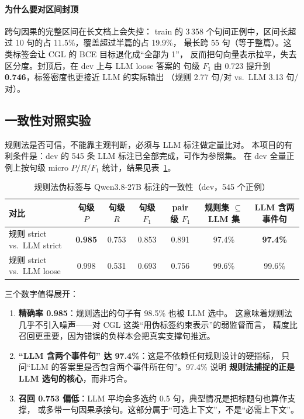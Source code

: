 \paragraph{为什么要对区间封顶}跨句因果的完整区间在长文档上会失控：
train 的 3\,358 个句间正例中，区间长超过 10 句的占 11.5\%，覆盖超过半篇的占 19.9\%，
最长跨 55 句（等于整篇）。这类标签会让 CGL 的 BCE 目标退化成“全部为 1”，
反而把句向量表示拉平，失去区分度。封顶后，在 dev 上与 LLM loose 答案的
句级 $F_1$ 由 0.723 提升到 \textbf{0.746}，标签密度也更接近 LLM 的实际输出
（规则 2.77 句/对 vs.\ LLM 3.13 句/对）。

\subsection{一致性对照实验}

规则法是否可信，不能靠主观判断，必须与 LLM 标注做定量比对。
本项目的有利条件是：dev 的 545 条 LLM 标注已全部完成，可作为参照集。
在 dev 全量正例上按句级 micro $P/R/F_1$ 统计，结果见表~\ref{tab:agree}。

\begin{table}[H]
\centering
\caption{规则法伪标签与 Qwen3.8-27B 标注的一致性（dev，545 个正例）}
\label{tab:agree}
\footnotesize
\setlength{\tabcolsep}{3.2pt}
\begin{tabular}{lcccccc}
\toprule
对比 & 句级 $P$ & 句级 $R$ & 句级 $F_1$ & pair 级 $F_1$
  & 规则集 $\subseteq$ LLM 集 & LLM 含两事件句\\
\midrule
规则 strict vs.\ LLM strict & \textbf{0.985} & 0.753 & 0.853 & 0.891 & 97.4\% & \textbf{97.4\%}\\
规则 strict vs.\ LLM loose  & 0.998 & 0.531 & 0.693 & 0.756 & 99.6\% & 99.6\%\\
\bottomrule
\end{tabular}
\end{table}

三个数字值得展开：

\begin{enumerate}
  \item \textbf{精确率 0.985}：规则选出的句子有 98.5\% 也被 LLM 选中。
        这意味着规则法几乎不引入噪声——对 CGL 这类“用伪标签约束表示”的弱监督而言，
        精度比召回更重要，因为错误的负样本会把真实支撑句推远。
  \item \textbf{“LLM 含两个事件句” 达 97.4\%}：这是不依赖任何规则设计的硬指标，
        只问“LLM 的答案里是否包含两个事件所在句”。97.4\% 说明
        \textbf{规则法捕捉的正是 LLM 选句的核心}，而非巧合。
  \item \textbf{召回 0.753 偏低}：LLM 平均会多选约 0.5 句，典型情况是把标题句也算作支撑，
        或多带一句因果承接句。这部分属于“可选上下文”，不是“必需上下文”。
\end{enumerate}

